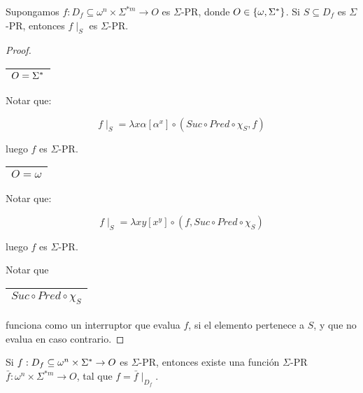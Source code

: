   \begin{lemma}
    \PN Supongamos $f: D_{f} \subseteq \omega^{n} \times \Sigma^{\ast m} \rightarrow O$ es $\Sigma$-PR, donde $O \in
    \{\omega, \Sigma^{\ast}\}$. Si $S \subseteq D_{f}$ es $\Sigma$-PR, entonces $f \mid_{S}$ es $\Sigma$-PR.
  \end{lemma}
  \begin{proof}
    \begin{tabular}{|c|} \hline $O = \Sigma^{\ast}$ \\\hline \end{tabular} Notar que:

    \[
      f \mid_{S} = \lambda x\alpha \left[\alpha^{x}\right] \circ (Suc \circ Pred \circ \chi_{S}, f)
    \]

    \PN luego $f$ es $\Sigma$-PR.

    \begin{tabular}{|c|} \hline $O = \omega$ \\\hline \end{tabular} Notar que:

    \[
      f \mid_{S} = \lambda xy \left[x^{y}\right] \circ (f, Suc \circ Pred \circ \chi_{S})
    \]

    \PN luego $f$ es $\Sigma$-PR.

    \vspace{3mm}
    \PN Notar que \begin{tabular}{|c|} \hline $Suc \circ Pred \circ \chi_{S}$ \\\hline \end{tabular} funciona como un
    interruptor que evalua $f$, si el elemento pertenece a $S$, y que no evalua en caso contrario.
  \end{proof}

  \begin{lemma}
    \PN Si $f: D_{f} \subseteq \omega^{n} \times \Sigma^{\ast} \rightarrow O$ es $\Sigma$-PR, entonces existe una función
    $\Sigma$-PR $\bar{f}: \omega^{n} \times \Sigma^{\ast m} \rightarrow O$, tal que $f = \bar{f} \mid_{D_{f}}$.
  \end{lemma}

